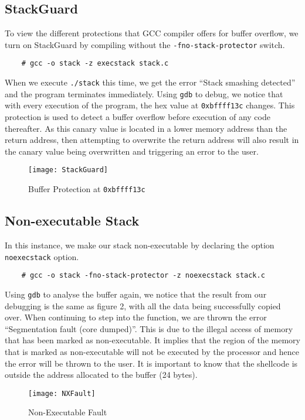 \documentclass[a4paper,12pt]{article}
\begin{document}
	\subsection{StackGuard}
	To view the different protections that GCC compiler offers for buffer overflow, we turn on StackGuard by compiling without the \texttt{-fno-stack-protector} switch.\begin{verbatim}
	# gcc -o stack -z execstack stack.c
	\end{verbatim}
	When we execute \texttt{./stack} this time, we get the error ``Stack smashing detected'' and the program terminates immediately. Using \texttt{gdb} to debug, we notice that with every execution of the program, the hex value at \texttt{0xbffff13c} changes. This protection is used to detect a buffer overflow before execution of any code thereafter. As this canary value is located in a lower memory address than the return address, then attempting to  overwrite the return address will also result in the canary value being overwritten and triggering an error to the user.
	\begin{figure}[H]
		\centering
		\texttt{[image: StackGuard]}
		\caption{Buffer Protection at \texttt{0xbffff13c}}
		\label{fig:stackguard}
	\end{figure}
	\subsection{Non-executable Stack}
	In this instance, we make our stack non-executable by declaring the option \texttt{noexecstack} option.
	\begin{verbatim}
	# gcc -o stack -fno-stack-protector -z noexecstack stack.c
	\end{verbatim}
	Using \texttt{gdb} to analyse the buffer again, we notice that the result from our debugging is the same as figure 2, with all the data being successfully copied over. When continuing to step into the function, we are thrown the error ``Segmentation fault (core dumped)''. This is due to the illegal access of memory that has been marked as non-executable. It implies that the region of the memory that is marked as non-executable will not be executed by the processor and hence the error will be thrown to the user. It is important to know that the shellcode is outside the address allocated to the buffer (24 bytes).
	\begin{figure}[H]
		\centering
		\texttt{[image: NXFault]}
		\caption{Non-Executable Fault}
		\label{fig:nxfault}
	\end{figure}
	\newpage
\end{document}

